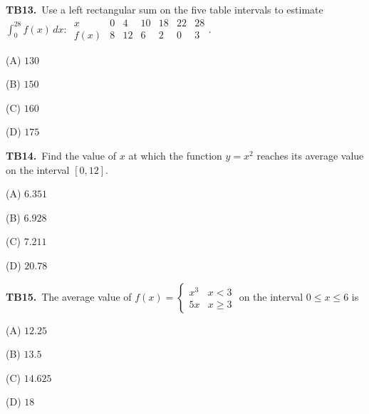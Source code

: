\documentclass[11pt]{article}
\begin{document}
\bigskip\noindent\textbf{TB13.}\ Use a left rectangular sum on the five table intervals to estimate $\int_0^{28}f(x)\,dx$: $\begin{array}{c|rrrrrr}x&0&4&10&18&22&28\\\hline f(x)&8&12&6&2&0&3\end{array}$.
\begin{list}{}{\setlength{\leftmargin}{3em}\setlength{\labelwidth}{2.5em}\setlength{\itemsep}{0pt}\setlength{\topsep}{2pt}}
\item[(A)] $130$
\item[(B)] $150$
\item[(C)] $160$
\item[(D)] $175$
\end{list}

\bigskip\noindent\textbf{TB14.}\ Find the value of $x$ at which the function $y=x^2$ reaches its average value on the interval $[0,12]$.
\begin{list}{}{\setlength{\leftmargin}{3em}\setlength{\labelwidth}{2.5em}\setlength{\itemsep}{0pt}\setlength{\topsep}{2pt}}
\item[(A)] $6.351$
\item[(B)] $6.928$
\item[(C)] $7.211$
\item[(D)] $20.78$
\end{list}

\bigskip\noindent\textbf{TB15.}\ The average value of $f(x) = \begin{cases} x^3 & x<3 \\ 5x & x \geq 3 \end{cases}$ on the interval $0 \leq x \leq 6$ is
\begin{list}{}{\setlength{\leftmargin}{3em}\setlength{\labelwidth}{2.5em}\setlength{\itemsep}{0pt}\setlength{\topsep}{2pt}}
\item[(A)] $12.25$
\item[(B)] $13.5$
\item[(C)] $14.625$
\item[(D)] $18$
\end{list}
\end{document}
